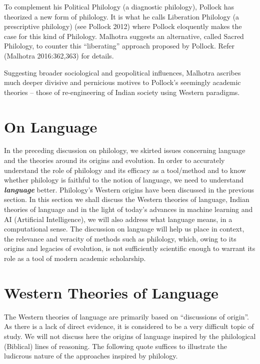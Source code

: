 To complement his Political Philology (a diagnostic philology), Pollock has theorized a new form of philology. It is what he calls Liberation Philology (a prescriptive philology) (see Pollock 2012) where Pollock eloquently makes the case for this kind of Philology. Malhotra suggests an alternative, called Sacred Philology, to counter this “liberating” approach proposed by Pollock. Refer (Malhotra 2016:362,363) for details.

Suggesting broader sociological and geopolitical influences, Malhotra ascribes much deeper divisive and pernicious motives to Pollock’s seemingly academic theories – those of re-engineering of Indian society using Western paradigms.


\section*{On Language}

\vskip -6pt

In the preceding discussion on philology, we skirted issues concerning language and the theories around its origins and evolution. In order to accurately understand the role of philology and its efficacy as a tool/method and to know whether philology is faithful to the notion of language, we need to understand \textbf{\textit{language}} better. Philology’s Western origins have been discussed in the previous section. In this section we shall discuss the Western theories of language, Indian theories of language and in the light of today’s advances in machine learning and AI (Artificial Intelligence), we will also address what language means, in a computational sense. The discussion on language will help us place in context, the relevance and veracity of methods such as philology, which, owing to its origins and legacies of evolution, is not sufficiently scientific enough to warrant its role as a tool of modern academic scholarship.


\section*{Western Theories of Language}

\vskip -6pt

The Western theories of language are primarily based on “discussions of origin”. As there is a lack of direct evidence, it is considered to be a very difficult topic of study. We will not discuss here the origins of language inspired by the philological (Biblical) lines of reasoning. The following quote suffices to illustrate the ludicrous nature of the approaches inspired by philology.

